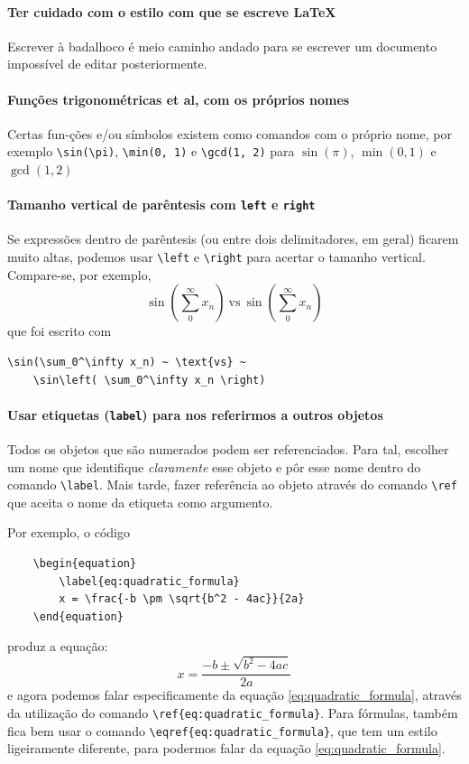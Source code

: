 \documentclass[11pt]{article}
\begin{document}
\paragraph{Ter cuidado com o estilo com que se escreve LaTeX}
Escrever à badalhoco é meio caminho andado para se escrever um documento impossível
de editar posteriormente.

\paragraph{Funções trigonométricas et al, com os próprios nomes}
Certas fun-ções e/ou símbolos existem como comandos com o próprio nome, por exemplo
\verb|\sin(\pi)|, \verb|\min(0, 1)| e \verb|\gcd(1, 2)| para
$\sin(\pi)$, $\min(0, 1)$ e $\gcd(1, 2)$

\paragraph{Tamanho vertical de parêntesis com \texttt{left} e \texttt{right}}
Se expressões dentro de parêntesis (ou entre dois delimitadores, em geral)
ficarem muito altas, podemos usar \verb|\left| e \verb|\right| para acertar
o tamanho vertical. Compare-se, por exemplo,
$$\sin(\sum_0^\infty x_n) ~ \text{vs} ~ \sin\left( \sum_0^\infty x_n \right)$$
que foi escrito com
\begin{verbatim}
\sin(\sum_0^\infty x_n) ~ \text{vs} ~ 
    \sin\left( \sum_0^\infty x_n \right)
\end{verbatim}

\paragraph{Usar etiquetas (\texttt{label}) para nos referirmos a outros objetos}
Todos os objetos que são numerados podem ser referenciados. Para tal, escolher
um nome que identifique \textit{claramente} esse objeto e pôr esse nome dentro
do comando \verb|\label|. Mais tarde, fazer referência ao objeto através do
comando \verb|\ref| que aceita o nome da etiqueta como argumento.

Por exemplo, o código
\begin{verbatim}
    \begin{equation}
        \label{eq:quadratic_formula}
        x = \frac{-b \pm \sqrt{b^2 - 4ac}}{2a}
    \end{equation}
\end{verbatim}
produz a equação:
\begin{equation}
    \label{eq:quadratic_formula}
    x = \frac{-b \pm \sqrt{b^2 - 4ac}}{2a}
\end{equation}
e agora podemos falar especificamente da equação \ref{eq:quadratic_formula},
através da utilização do comando \verb|\ref{eq:quadratic_formula}|. Para fórmulas,
também fica bem usar o comando \verb|\eqref{eq:quadratic_formula}|, que tem um
estilo ligeiramente diferente, para podermos falar da equação
\eqref{eq:quadratic_formula}.
\end{document}
